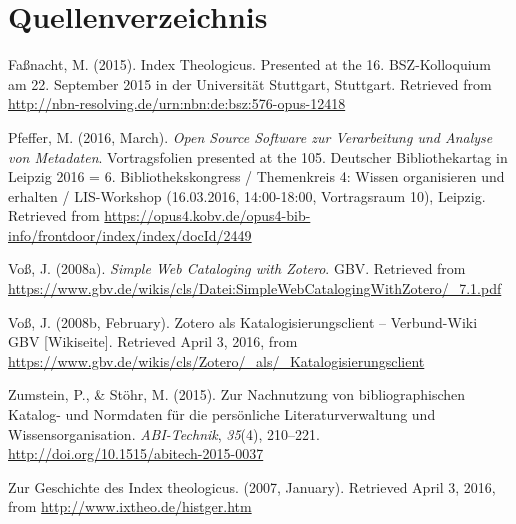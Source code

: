 \documentclass[a4paper,
fontsize=11pt,
oneside,
numbers=noperiodatend,
parskip=half-,
bibliography=totoc,
final
]{scrartcl}
\begin{document}
\section*{Quellenverzeichnis}\label{quellenverzeichnis}

Faßnacht, M. (2015). Index Theologicus. Presented at the 16.
BSZ-Kolloquium am 22. September 2015 in der Universität Stuttgart,
Stuttgart. Retrieved from
\url{http://nbn-resolving.de/urn:nbn:de:bsz:576-opus-12418}

Pfeffer, M. (2016, March). \emph{Open Source Software zur Verarbeitung
und Analyse von Metadaten}. Vortragsfolien presented at the 105.
Deutscher Bibliothekartag in Leipzig 2016 = 6. Bibliothekskongress /
Themenkreis 4: Wissen organisieren und erhalten / LIS-Workshop
(16.03.2016, 14:00-18:00, Vortragsraum 10), Leipzig. Retrieved from
\url{https://opus4.kobv.de/opus4-bib-info/frontdoor/index/index/docId/2449}

Voß, J. (2008a). \emph{Simple Web Cataloging with Zotero}. GBV.
Retrieved from
\url{https://www.gbv.de/wikis/cls/Datei:SimpleWebCatalogingWithZotero/_7.1.pdf}

Voß, J. (2008b, February). Zotero als Katalogisierungsclient --
Verbund-Wiki GBV {[}Wikiseite{]}. Retrieved April 3, 2016, from
\url{https://www.gbv.de/wikis/cls/Zotero/_als/_Katalogisierungsclient}

Zumstein, P., \& Stöhr, M. (2015). Zur Nachnutzung von bibliographischen
Katalog- und Normdaten für die persönliche Literaturverwaltung und
Wissensorganisation. \emph{ABI-Technik}, \emph{35}(4), 210--221.
\url{http://doi.org/10.1515/abitech-2015-0037}

Zur Geschichte des Index theologicus. (2007, January). Retrieved April
3, 2016, from \url{http://www.ixtheo.de/histger.htm}

\end{document}
